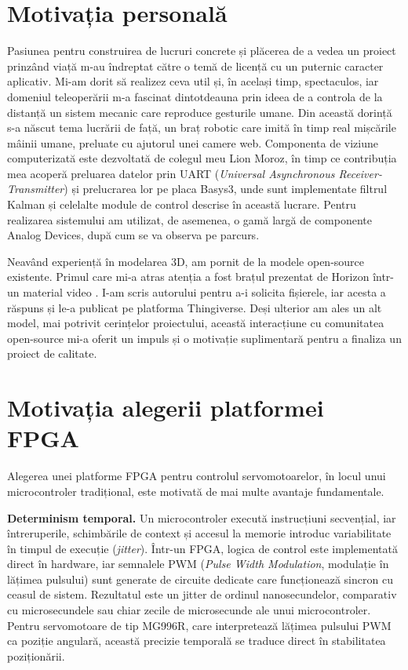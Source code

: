 \section{Motivația personală}
\label{sec:intro-motivatie-personala}

Pasiunea pentru construirea de lucruri concrete și plăcerea de a vedea un
proiect prinzând viață m-au îndreptat către o temă de licență cu un puternic
caracter aplicativ. Mi-am dorit să realizez ceva util
și, în același timp, spectaculos, iar domeniul teleoperării m-a fascinat
dintotdeauna prin ideea de a controla de la distanță un sistem mecanic care
reproduce gesturile umane. Din această dorință s-a născut tema lucrării de
față, un braț robotic care imită în timp real mișcările mâinii umane,
preluate cu ajutorul unei camere web. Componenta de viziune computerizată
este dezvoltată de colegul meu Lion Moroz, în timp ce contribuția mea
acoperă preluarea datelor prin UART (\textit{Universal Asynchronous
Receiver-Transmitter}) și prelucrarea lor pe placa Basys3, unde
sunt implementate filtrul Kalman și celelalte module de control descrise în
această lucrare. Pentru realizarea sistemului am utilizat, de asemenea, o
gamă largă de componente Analog Devices, după cum se va observa pe parcurs.

Neavând experiență în modelarea 3D, am pornit de la modele open-source
existente. Primul care mi-a atras atenția a fost brațul prezentat de Horizon
într-un material video \cite{horizon_hand}. I-am scris autorului pentru a-i
solicita fișierele, iar acesta a răspuns și le-a publicat pe platforma
Thingiverse. Deși ulterior am ales un alt model, mai potrivit cerințelor
proiectului, această interacțiune cu comunitatea open-source mi-a oferit un
impuls și o motivație suplimentară pentru a finaliza un proiect de calitate.

\section{Motivația alegerii platformei FPGA}
\label{sec:intro-fpga}

Alegerea unei platforme FPGA pentru
controlul servomotoarelor, în locul unui microcontroler tradițional, este
motivată de mai multe avantaje fundamentale.

\textbf{Determinism temporal.} Un microcontroler execută instrucțiuni secvențial,
iar întreruperile, schimbările de context și accesul la memorie introduc
variabilitate în timpul de execuție (\textit{jitter}). Într-un FPGA, logica de
control este implementată direct în hardware, iar semnalele PWM (\textit{Pulse
Width Modulation}, modulație în lățimea pulsului) sunt generate de
circuite dedicate care funcționează sincron cu ceasul de sistem. Rezultatul este
un jitter de ordinul nanosecundelor, comparativ cu microsecundele sau chiar
zecile de microsecunde ale unui microcontroler. Pentru servomotoare de tip
MG996R, care interpretează lățimea pulsului PWM ca poziție angulară, această
precizie temporală se traduce direct în stabilitatea poziționării.

